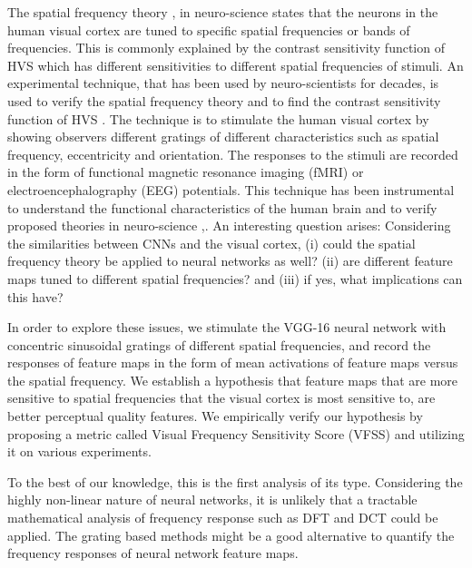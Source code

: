 \documentclass[10pt,twocolumn,letterpaper]{article}
\begin{document}
   The spatial frequency theory \cite{13},\cite{14} in neuro-science states that the neurons in the human visual cortex are tuned to specific spatial frequencies or bands of frequencies. This is commonly explained by the contrast sensitivity function of HVS which has different sensitivities to different spatial frequencies of stimuli. An experimental technique, that has been used by neuro-scientists for decades, is used to verify the spatial frequency theory and to find the contrast sensitivity function of HVS \cite{15}. The technique is to stimulate the human visual cortex by showing observers different gratings of different characteristics such as spatial frequency, eccentricity and orientation. The responses to the stimuli are recorded in the form of functional magnetic resonance imaging (fMRI) or electroencephalography (EEG) potentials. This technique has been instrumental to understand the functional characteristics of the human brain and to verify proposed theories in neuro-science \cite{16},\cite{17}. An interesting question arises: Considering the similarities between CNNs and the visual cortex, (i) could the spatial frequency theory be applied to neural networks as well? (ii) are different feature maps tuned to different spatial frequencies? and (iii) if yes, what implications can this have?

    In order to explore these issues, we stimulate the VGG-16 \cite{30} neural network with concentric sinusoidal gratings of different spatial frequencies, and record the responses of feature maps in the form of mean activations of feature maps versus the spatial frequency. We establish a hypothesis that feature maps that are more sensitive to  spatial frequencies that the visual cortex is most sensitive to, are better perceptual quality features. We empirically verify our hypothesis by proposing a metric called Visual Frequency Sensitivity Score (VFSS) and utilizing it on various experiments.

   To the best of our knowledge, this is the first analysis of its type. Considering the highly non-linear nature of neural networks, it is unlikely that a tractable mathematical analysis of frequency response such as DFT and DCT could be applied. The grating based methods might be a good alternative to quantify the frequency responses of neural network feature maps.
\end{document}
